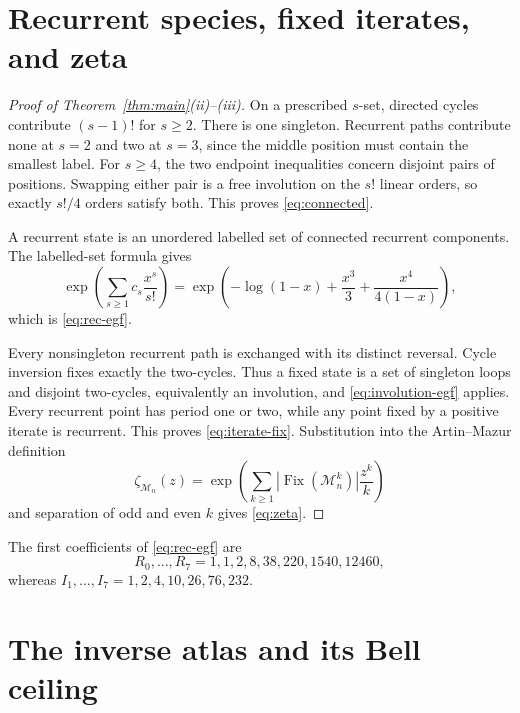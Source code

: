\documentclass[a4paper,10pt]{amsart}
\theoremstyle{remark}
\newcommand{\M}{\mathcal M}
\newcommand{\Fix}{\operatorname{Fix}}
\begin{document}
\section{Recurrent species, fixed iterates, and zeta}

\begin{proof}[Proof of Theorem~\ref{thm:main}(ii)--(iii)]
On a prescribed $s$-set, directed cycles contribute $(s-1)!$ for $s\geq2$.
There is one singleton.  Recurrent paths contribute none at $s=2$ and two
at $s=3$, since the middle position must contain the smallest label.  For
$s\geq4$, the two endpoint inequalities concern disjoint pairs of
positions.  Swapping either pair is a free involution on the $s!$ linear
orders, so exactly $s!/4$ orders satisfy both.  This proves
\eqref{eq:connected}.

A recurrent state is an unordered labelled set of connected recurrent
components.  The labelled-set formula gives
\[
 \exp\!\left(\sum_{s\geq1}c_s\frac{x^s}{s!}\right)
 =\exp\!\left(-\log(1-x)+\frac{x^3}{3}
                   +\frac{x^4}{4(1-x)}\right),
\]
which is \eqref{eq:rec-egf}.

Every nonsingleton recurrent path is exchanged with its distinct reversal.
Cycle inversion fixes exactly the two-cycles.  Thus a fixed state is a set
of singleton loops and disjoint two-cycles, equivalently an involution, and
\eqref{eq:involution-egf} applies.  Every recurrent point has period one or
two, while any point fixed by a positive iterate is recurrent.  This proves
\eqref{eq:iterate-fix}.  Substitution into the Artin--Mazur definition
\[
 \zeta_{\M_n}(z)=\exp\!\left(
    \sum_{k\geq1}|\Fix(\M_n^k)|\frac{z^k}{k}\right)
\]
and separation of odd and even $k$ gives \eqref{eq:zeta}.
\end{proof}

The first coefficients of \eqref{eq:rec-egf} are
\[
 R_0,\ldots,R_7=1,1,2,8,38,220,1540,12460,
\]
whereas $I_1,\ldots,I_7=1,2,4,10,26,76,232$.

\section{The inverse atlas and its Bell ceiling}
\end{document}
